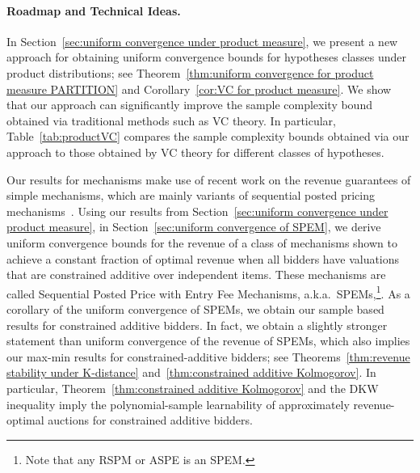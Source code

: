 \vspace{-10pt}\paragraph{Roadmap and Technical Ideas.} In Section~\ref{sec:uniform convergence under product measure}, we present a new approach for obtaining uniform convergence bounds for hypotheses classes under product distributions; see Theorem~\ref{thm:uniform convergence for product measure PARTITION} and Corollary~\ref{cor:VC for product measure}. We show that our approach can significantly improve the sample complexity bound obtained via traditional methods such as VC theory. In particular, Table~\ref{tab:productVC} compares the sample complexity bounds obtained via our approach to those obtained by VC theory for different classes of hypotheses.

Our results for mechanisms make use of recent work on the revenue guarantees of simple mechanisms, which are mainly variants of sequential posted pricing mechanisms~\cite{CaiDW16,CaiZ17}. Using our results from Section~\ref{sec:uniform convergence under product measure}, in Section~\ref{sec:uniform convergence of SPEM}, we derive uniform convergence bounds for the revenue of a class of mechanisms shown to achieve a constant fraction of optimal revenue when all bidders have valuations that are constrained additive over independent items. These mechanisms are called Sequential Posted Price with Entry Fee Mechanisms, a.k.a.~SPEMs,\footnote{Note that any RSPM or ASPE is an SPEM.}. As a corollary of the uniform convergence of SPEMs, we obtain our sample based results for constrained additive bidders. In fact, we obtain a slightly stronger statement than uniform convergence of the revenue of SPEMs, which also implies our max-min results for constrained-additive bidders; see Theorems~\ref{thm:revenue stability under K-distance} and~\ref{thm:constrained additive Kolmogorov}. In particular, Theorem~\ref{thm:constrained additive Kolmogorov} and the DKW inequality imply the polynomial-sample learnability of approximately revenue-optimal auctions for constrained additive bidders.





